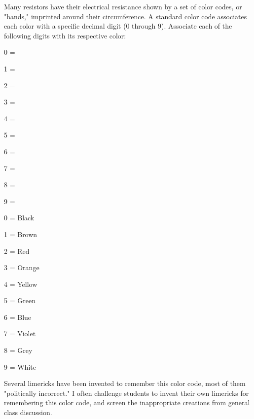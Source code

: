 

Many resistors have their electrical resistance shown by a set of color codes, or "bands," imprinted around their circumference.  A standard color code associates each color with a specific decimal digit (0 through 9).  Associate each of the following digits with its respective color:

\medskip
\item 0 = 
\item 1 =  
\item 2 =  
\item 3 = 
\item 4 = 
\item 5 = 
\item 6 = 
\item 7 = 
\item 8 = 
\item 9 = 
\medskip





\medskip
\item 0 = Black
\item 1 = Brown
\item 2 = Red
\item 3 = Orange
\item 4 = Yellow
\item 5 = Green
\item 6 = Blue
\item 7 = Violet
\item 8 = Grey
\item 9 = White
\medskip







Several limericks have been invented to remember this color code, most of them "politically incorrect."  I often challenge students to invent their own limericks for remembering this color code, and screen the inappropriate creations from general class discussion.




